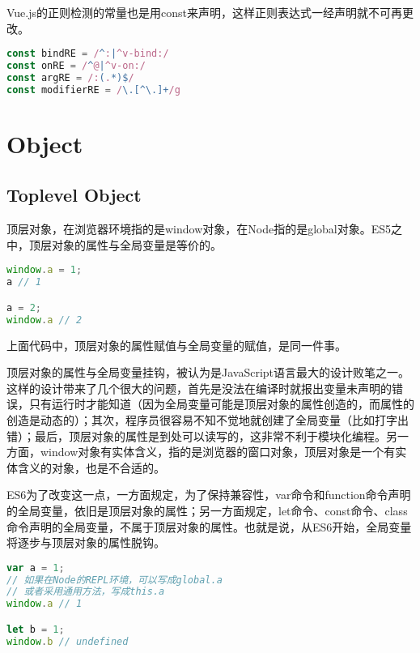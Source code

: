 Vue.js的正则检测的常量也是用const来声明，这样正则表达式一经声明就不可再更改。







\begin{lstlisting}[language=JavaScript]
const bindRE = /^:|^v-bind:/
const onRE = /^@|^v-on:/
const argRE = /:(.*)$/
const modifierRE = /\.[^\.]+/g
\end{lstlisting}



\chapter{Object}


\section{Toplevel Object}

顶层对象，在浏览器环境指的是window对象，在Node指的是global对象。ES5之中，顶层对象的属性与全局变量是等价的。



\begin{lstlisting}[language=JavaScript]
window.a = 1;
a // 1

a = 2;
window.a // 2
\end{lstlisting}

上面代码中，顶层对象的属性赋值与全局变量的赋值，是同一件事。

顶层对象的属性与全局变量挂钩，被认为是JavaScript语言最大的设计败笔之一。这样的设计带来了几个很大的问题，首先是没法在编译时就报出变量未声明的错误，只有运行时才能知道（因为全局变量可能是顶层对象的属性创造的，而属性的创造是动态的）；其次，程序员很容易不知不觉地就创建了全局变量（比如打字出错）；最后，顶层对象的属性是到处可以读写的，这非常不利于模块化编程。另一方面，window对象有实体含义，指的是浏览器的窗口对象，顶层对象是一个有实体含义的对象，也是不合适的。


ES6为了改变这一点，一方面规定，为了保持兼容性，var命令和function命令声明的全局变量，依旧是顶层对象的属性；另一方面规定，let命令、const命令、class命令声明的全局变量，不属于顶层对象的属性。也就是说，从ES6开始，全局变量将逐步与顶层对象的属性脱钩。




\begin{lstlisting}[language=JavaScript]
var a = 1;
// 如果在Node的REPL环境，可以写成global.a
// 或者采用通用方法，写成this.a
window.a // 1

let b = 1;
window.b // undefined
\end{lstlisting}

